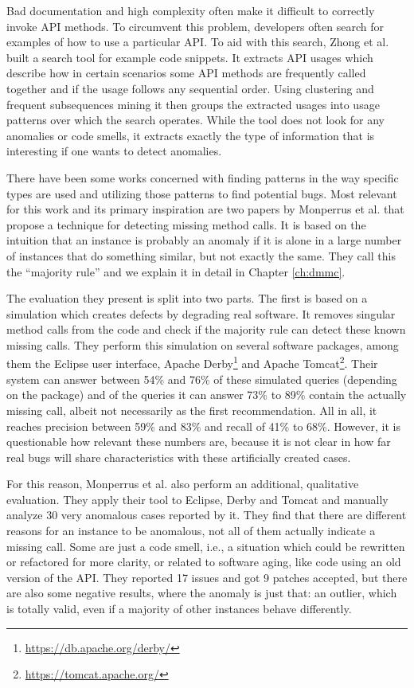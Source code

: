 Bad documentation and high complexity often make it difficult to correctly invoke API methods.
To circumvent this problem, developers often search for examples of how to use a particular API.
To aid with this search, Zhong et al. \cite{zhong2009mapo} built a search tool for example code snippets.
It extracts API usages which describe how in certain scenarios some API methods are frequently called together and if the usage follows any sequential order.
Using clustering and frequent subsequences mining it then groups the extracted usages into usage patterns over which the search operates.
While the tool does not look for any anomalies or code smells, it extracts exactly the type of information that is interesting if one wants to detect anomalies.

There have been some works concerned with finding patterns in the way specific types are used and utilizing those patterns to find potential bugs.
Most relevant for this work and its primary inspiration are two papers by Monperrus et al. \cite{monperrus2010detecting}\cite{monperrus2013detecting} that propose a technique for detecting missing method calls.
It is based on the intuition that an instance is probably an anomaly if it is alone in a large number of instances that do something similar, but not exactly the same.
They call this the ``majority rule'' and we explain it in detail in Chapter \ref{ch:dmmc}.

The evaluation they present is split into two parts.
The first is based on a simulation which creates defects by degrading real software.
It removes singular method calls from the code and check if the majority rule can detect these known missing calls.
They perform this simulation on several software packages, among them the Eclipse user interface, Apache Derby\footnote{\url{https://db.apache.org/derby/}} and Apache Tomcat\footnote{\url{https://tomcat.apache.org/}}.
Their system can answer between 54\% and 76\% of these simulated queries (depending on the package) and of the queries it can answer 73\% to 89\% contain the actually missing call, albeit not necessarily as the first recommendation.
All in all, it reaches precision between 59\% and 83\% and recall of 41\% to 68\%.
However, it is questionable how relevant these numbers are, because it is not clear in how far real bugs will share characteristics with these artificially created cases.

For this reason, Monperrus et al. also perform an additional, qualitative evaluation.
They apply their tool to Eclipse, Derby and Tomcat and manually analyze 30 very anomalous cases reported by it.
They find that there are different reasons for an instance to be anomalous, not all of them actually indicate a missing call.
Some are just a code smell, i.e., a situation which could be rewritten or refactored for more clarity, or related to software aging, like code using an old version of the API.
They reported 17 issues and got 9 patches accepted, but there are also some negative results, where the anomaly is just that: an outlier, which is totally valid, even if a majority of other instances behave differently.

